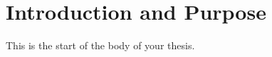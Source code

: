 

\chapter{Introduction and Purpose} \label{chapterintroduction}

This is the start of the body of your thesis.





